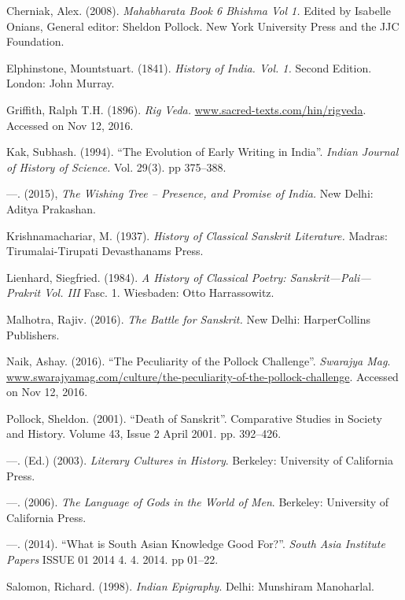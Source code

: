 \begin{thebibliography}{99}
 Cherniak, Alex. (2008). \textit{Mahabharata Book 6 Bhishma Vol 1.} Edited by Isabelle Onians, General editor: Sheldon Pollock. New York University Press and the JJC Foundation.

  Elphinstone, Mountstuart. (1841). \textit{History of India. Vol. 1.} Second Edition. London: John Murray.

  Griffith, Ralph T.H. (1896). \textit{Rig Veda.} \url{www.sacred-texts.com/hin/rigveda}. Accessed on Nov 12, 2016.

  Kak, Subhash. (1994). “The Evolution of Early Writing in India”. \textit{Indian Journal of History of Science.} Vol. 29(3). pp 375--388.

  —. (2015), \textit{The Wishing Tree – Presence, and Promise of India.} New Delhi: Aditya Prakashan.

  Krishnamachariar, M. (1937). \textit{History of Classical Sanskrit Literature.} Madras: Tirumalai-Tirupati Devasthanams Press.

  Lienhard, Siegfried. (1984). \textit{A History of Classical Poetry: Sanskrit—Pali—Prakrit Vol. III} Fasc. 1. Wiesbaden: Otto Harrassowitz.

  Malhotra, Rajiv. (2016). \textit{The Battle for Sanskrit.} New Delhi: HarperCollins Publishers.

  Naik, Ashay. (2016). “The Peculiarity of the Pollock Challenge”. \textit{Swarajya Mag}. \url{www.swarajyamag.com/culture/the-peculiarity-of-the-pollock-challenge}. Accessed on Nov 12, 2016.

  Pollock, Sheldon. (2001). “Death of Sanskrit”. Comparative Studies in Society and History. Volume 43, Issue 2 April 2001. pp. 392--426. 

  —. (Ed.) (2003). \textit{Literary Cultures in History}. Berkeley: University of California Press.

  —. (2006). \textit{The Language of Gods in the World of Men}. Berkeley: University of California Press.

  —. (2014). “What is South Asian Knowledge Good For?”. \textit{South Asia Institute Papers} ISSUE 01 2014 4. 4. 2014. pp 01--22.

  Salomon, Richard. (1998). \textit{Indian Epigraphy}. Delhi: Munshiram Manoharlal.


\end{thebibliography}
